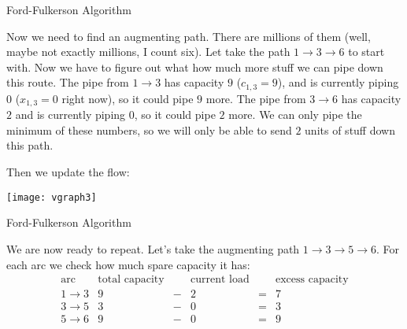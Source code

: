 \begin{frame}[fragile]{Ford-Fulkerson Algorithm}

Now we need to find an augmenting path.  There are millions of them (well, maybe not exactly millions, I count six).  Let take the path $1\rightarrow 3\rightarrow 6$ to start with.  Now we have to figure out what how much more stuff we can pipe down this route.  The pipe from $1\rightarrow 3$ has capacity $9$ ($c_{1,3}=9$), and is currently piping $0$ ($x_{1,3}=0$ right now), so it could pipe $9$ more.  The pipe from $3\rightarrow 6$ has capacity $2$ and is currently piping $0$, so it could pipe $2$ more.  We can only pipe the minimum of these numbers, so we will only be able to send $2$ units of stuff down this path.

Then we update the flow:

\begin{center}
\texttt{[image: vgraph3]}
\end{center}



\end{frame}
\begin{frame}[fragile]{Ford-Fulkerson Algorithm}

We are now ready to repeat.  Let's take the augmenting path $1\rightarrow 3\rightarrow 5\rightarrow 6$.  For each arc we check how much spare capacity it has:
$$
\begin{array}{r|ccccc}
\mbox{arc}&\mbox{total capacity}&&\mbox{current load}&&\mbox{excess capacity}\\
\hline
1\rightarrow 3&9&-&2&=&7\\
3\rightarrow 5&3&-&0&=&3\\
5\rightarrow 6&9&-&0&=&9
\end{array}
$$

\end{frame}
